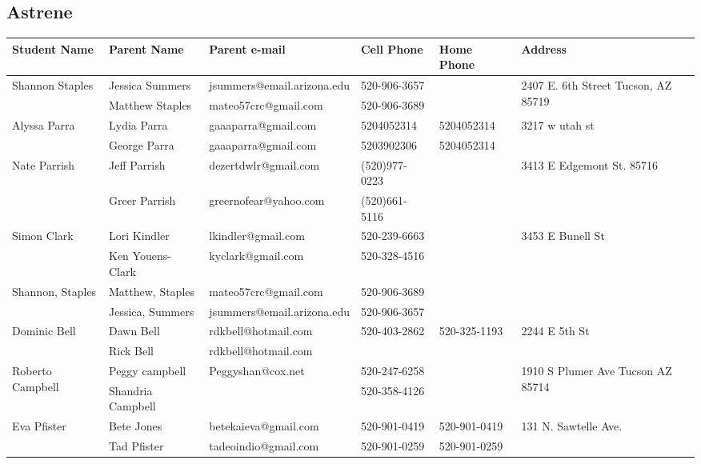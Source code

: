 \documentclass[landscape]{article}\usepackage[]{graphicx}\usepackage[]{color}
\begin{document}
\subsection{Astrene}
\begin{longtable}{p{70pt}|p{75pt}|p{120pt}|p{60pt}|p{60pt}|p{120pt}|}
Student Name & Parent Name & Parent e-mail & Cell Phone & Home Phone & Address\\
\hline
\multirow{2}{70pt}{Shannon Staples} & Jessica Summers & jsummers@email.arizona.edu & 520-906-3657 &  & \multirow{2}{100pt}{2407 E. 6th Street Tucson, AZ  85719} \\
 & Matthew Staples & mateo57crc@gmail.com & 520-906-3689 &  & \\
\hline
\multirow{2}{70pt}{Alyssa Parra} & Lydia Parra & gaaaparra@gmail.com & 5204052314 & 5204052314 & \multirow{2}{100pt}{3217 w utah st} \\
 & George Parra & gaaaparra@gmail.com & 5203902306 & 5204052314 & \\
\hline
\multirow{2}{70pt}{Nate Parrish} & Jeff Parrish & dezertdwlr@gmail.com & (520)977-0223 &  & \multirow{2}{100pt}{3413 E Edgemont St. 85716} \\
 & Greer Parrish & greernofear@yahoo.com & (520)661-5116 &  & \\
\hline
\multirow{2}{70pt}{Simon Clark} & Lori Kindler & lkindler@gmail.com & 520-239-6663 &  & \multirow{2}{100pt}{3453 E Bunell St} \\
 & Ken Youens-Clark & kyclark@gmail.com & 520-328-4516 &  & \\
\hline
\multirow{2}{70pt}{Shannon, Staples} & Matthew, Staples & mateo57crc@gmail.com & 520-906-3689 &  & \multirow{2}{100pt}{} \\
 & Jessica, Summers & jsummers@email.arizona.edu & 520-906-3657 &  & \\
\hline
\multirow{2}{70pt}{Dominic Bell} & Dawn Bell & rdkbell@hotmail.com & 520-403-2862 & 520-325-1193 & \multirow{2}{100pt}{2244 E 5th St} \\
 & Rick Bell & rdkbell@hotmail.com &  &  & \\
\hline
\multirow{2}{70pt}{Roberto Campbell } & Peggy campbell & Peggyshan@cox.net & 520-247-6258 &  & \multirow{2}{100pt}{1910 S Plumer Ave Tucson AZ 85714} \\
 & Shandria Campbell  &  & 520-358-4126 &  & \\
\hline
\multirow{2}{70pt}{Eva Pfister} & Bete Jones & betekaieva@gmail.com & 520-901-0419 & 520-901-0419 & \multirow{2}{100pt}{131 N. Sawtelle Ave.} \\
 & Tad Pfister & tadeoindio@gmail.com & 520-901-0259 & 520-901-0259 & \\
\hline
\end{longtable}
\newpage
\end{document}
